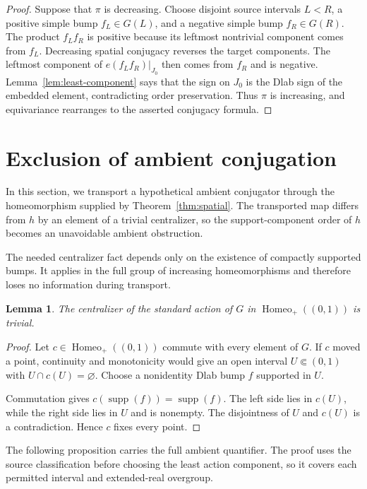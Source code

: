 \documentclass[11pt]{amsart}
\newtheorem{lemma}[theorem]{Lemma}
\theoremstyle{definition}
\theoremstyle{remark}
\numberwithin{equation}{section}
\begin{document}
\begin{proof}
Suppose that \(\pi\) is decreasing. Choose disjoint source intervals \(L<R\), a positive simple bump \(f_L\in G(L)\), and a negative simple bump \(f_R\in G(R)\). The product \(f_Lf_R\) is positive because its leftmost nontrivial component comes from \(f_L\). Decreasing spatial conjugacy reverses the target components. The leftmost component of \(e(f_Lf_R)|_{J_0}\) then comes from \(f_R\) and is negative. Lemma~\ref{lem:least-component} says that the sign on \(J_0\) is the Dlab sign of the embedded element, contradicting order preservation. Thus \(\pi\) is increasing, and equivariance rearranges to the asserted conjugacy formula.
\end{proof}

\section{Exclusion of ambient conjugation}
\label{sec:exclusion}

In this section, we transport a hypothetical ambient conjugator through the homeomorphism supplied by Theorem~\ref{thm:spatial}. The transported map differs from \(h\) by an element of a trivial centralizer, so the support-component order of \(h\) becomes an unavoidable ambient obstruction.

The needed centralizer fact depends only on the existence of compactly supported bumps. It applies in the full group of increasing homeomorphisms and therefore loses no information during transport.

\begin{lemma}
\label{lem:trivial-centralizer}
The centralizer of the standard action of \(G\) in \(\operatorname{Homeo}_+((0,1))\) is trivial.
\end{lemma}

\begin{proof}
Let \(c\in\operatorname{Homeo}_+((0,1))\) commute with every element of \(G\). If \(c\) moved a point, continuity and monotonicity would give an open interval \(U\Subset(0,1)\) with \(U\cap c(U)=\varnothing\). Choose a nonidentity Dlab bump \(f\) supported in \(U\).

Commutation gives \(c(\operatorname{supp}(f))=\operatorname{supp}(f)\). The left side lies in \(c(U)\), while the right side lies in \(U\) and is nonempty. The disjointness of \(U\) and \(c(U)\) is a contradiction. Hence \(c\) fixes every point.
\end{proof}

The following proposition carries the full ambient quantifier. The proof uses the source classification before choosing the least action component, so it covers each permitted interval and extended-real overgroup.
\end{document}
